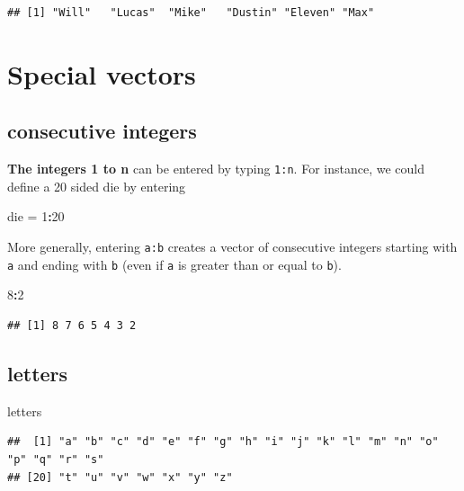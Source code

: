 \documentclass[
]{book}
\newenvironment{Shaded}{\begin{snugshade}}{\end{snugshade}}
\newcommand{\DecValTok}[1]{\textcolor[rgb]{0.00,0.00,0.81}{#1}}
\newcommand{\NormalTok}[1]{#1}
\newcommand{\OtherTok}[1]{\textcolor[rgb]{0.56,0.35,0.01}{#1}}
\newcommand{\SpecialCharTok}[1]{\textcolor[rgb]{0.81,0.36,0.00}{\textbf{#1}}}
\theoremstyle{definition}
\theoremstyle{definition}
\theoremstyle{definition}
\theoremstyle{definition}
\theoremstyle{remark}
\begin{document}
\begin{verbatim}
## [1] "Will"   "Lucas"  "Mike"   "Dustin" "Eleven" "Max"
\end{verbatim}

\section{Special vectors}\label{special-vectors}

\subsection{consecutive integers}\label{consecutive-integers}

\textbf{The integers 1 to n} can be entered by typing \texttt{1:n}. For instance, we could define a 20 sided die by entering

\begin{Shaded}
\begin{Highlighting}[]
\NormalTok{die }\OtherTok{=} \DecValTok{1}\SpecialCharTok{:}\DecValTok{20}
\end{Highlighting}
\end{Shaded}

More generally, entering \texttt{a:b} creates a vector of consecutive integers starting with \texttt{a} and ending with \texttt{b} (even if \texttt{a} is greater than or equal to \texttt{b}).

\begin{Shaded}
\begin{Highlighting}[]
\DecValTok{8}\SpecialCharTok{:}\DecValTok{2}
\end{Highlighting}
\end{Shaded}

\begin{verbatim}
## [1] 8 7 6 5 4 3 2
\end{verbatim}

\subsection{letters}\label{letters}

\begin{Shaded}
\begin{Highlighting}[]
\NormalTok{letters}
\end{Highlighting}
\end{Shaded}

\begin{verbatim}
##  [1] "a" "b" "c" "d" "e" "f" "g" "h" "i" "j" "k" "l" "m" "n" "o" "p" "q" "r" "s"
## [20] "t" "u" "v" "w" "x" "y" "z"
\end{verbatim}
\end{document}
